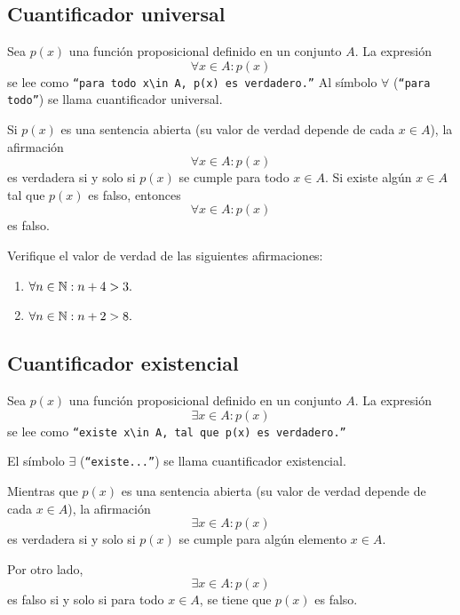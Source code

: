 \subsection{Cuantificador universal}


 Sea $p(x)$ una función proposicional definido en un conjunto $A.$ La expresión
 \[
 \label{lip:4.1}
   \forall x \in A: p(x)
 \] 
 se lee como  \texttt{``para todo $x\in A,$ $p(x)$ es verdadero.''}  Al símbolo $\forall$ (\texttt{``para todo''}) se llama cuantificador universal.

 Si $p(x)$ es una sentencia abierta (su valor de verdad depende de cada $x\in A$), la afirmación 
 $$\forall x\in A: p(x)$$ es verdadera si y solo si $p(x)$ se cumple para todo $x\in A.$  Si existe algún $x\in A$ tal que $p(x)$ es falso, entonces $$\forall x\in A: p(x)$$ es falso.



 \begin{resuelto}
  \label{lip:exmp:4.8}
  Verifique el valor de verdad de las siguientes afirmaciones:
  \begin{enumerate}
   \item $\forall n \in \mathbb{N}: n+4>3.$ 
   \item $\forall n \in \mathbb{N}: n+2>8.$
  \end{enumerate}

 \end{resuelto}



\subsection{Cuantificador existencial}


 Sea $p(x)$ una función proposicional definido en un conjunto $A.$ La expresión
 \[
 \label{lip:4.3}
   \exists x \in A: p(x)
 \] 
 se lee como  \texttt{``existe $x\in A,$ tal que $p(x)$ es verdadero.''}  
 
 El símbolo $\exists$ (\texttt{``existe...''}) se llama cuantificador existencial.




 Mientras que $p(x)$ es una sentencia abierta (su valor de verdad depende de cada $x\in A$), la afirmación 
 $$\exists x\in A: p(x)$$ es verdadera si y solo si $p(x)$ se cumple para algún elemento $x\in A.$  



 Por otro lado,  $$\exists x\in A: p(x)$$ es falso si y solo si para todo $ x\in A $, se tiene que $ p(x) $ es falso.



